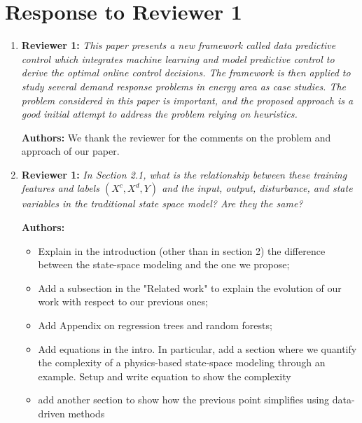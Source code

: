 \documentclass{article}
\begin{document}
\section{Response to Reviewer 1}



\begin{enumerate}

\item \textbf{Reviewer 1:} \textit{This paper presents a new framework called data predictive control which integrates machine learning and model predictive control to derive the optimal online control decisions. The framework is then applied to study several demand response problems in energy area as case studies. The problem considered in this paper is important, and the proposed approach is a good initial attempt to address the problem relying on heuristics.}



\textbf{Authors:} We thank the reviewer for the comments on the problem and approach of our paper.



\item \textbf{Reviewer 1:} \textit{In Section 2.1, what is the relationship between these training features and labels $(X^c, X^d, Y)$ and the input, output, disturbance, and state variables in the traditional state space model? Are they the same?}



\textbf{Authors:} 

	\begin{itemize}

		\item Explain in the introduction (other than in section 2) the difference between the state-space modeling and the one we propose;

		\item Add a subsection in the "Related work" to explain the evolution of our work with respect to our previous ones;

		\item Add Appendix on regression trees and random forests;

		\item Add equations in the intro. In particular, add a section where we quantify the complexity of a physics-based state-space modeling through an example. Setup and write equation to show the complexity

		\item add another section to show how the previous point simplifies using data-driven methods


\end{itemize}
\end{enumerate}
\end{document}
